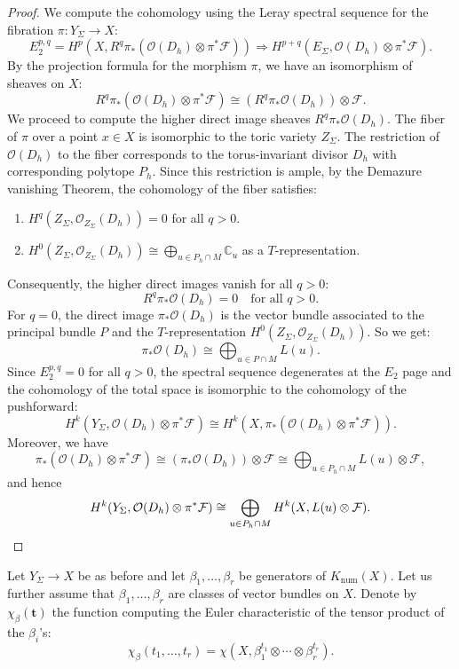 \documentclass[oneside]{amsart}
\theoremstyle{plain}
\theoremstyle{definition}
\newcommand{\C}{{\mathbb{C}}}
\newcommand{\Om}{{\mathcal{O}}}
\newcommand{\num}{{\mathrm{num}}}
\begin{document}
\begin{proof}
We compute the cohomology using the Leray spectral sequence for the fibration $\pi: Y_\Sigma \to X$:
\[
E_2^{p,q} = H^p(X, R^q \pi_* (\Om(D_h) \otimes \pi^* \mathcal{F})) \Rightarrow H^{p+q}(E_\Sigma, \Om(D_h) \otimes \pi^* \mathcal{F}).
\]
By the projection formula for the morphism $\pi$, we have an isomorphism of sheaves on $X$:
\[
R^q \pi_* (\Om(D_h) \otimes \pi^* \mathcal{F}) \cong (R^q \pi_* \Om(D_h)) \otimes \mathcal{F}.
\]
We proceed to compute the higher direct image sheaves $R^q \pi_*\Om(D_h)$. The fiber of $\pi$ over a point $x \in X$ is isomorphic to the toric variety $Z_\Sigma$. The restriction of $\Om(D_h)$ to the fiber corresponds to the torus-invariant divisor $D_h$ with corresponding polytope $P_h$. Since this restriction is ample, by the Demazure vanishing Theorem, the cohomology of the fiber satisfies:
\begin{enumerate}
    \item $H^q(Z_\Sigma, \Om_{Z_\Sigma}(D_h)) = 0$ for all $q > 0$.
    \item $H^0(Z_\Sigma, \Om_{Z_\Sigma}(D_h)) \cong \bigoplus_{u \in P_h \cap M} \C_u$ as a $T$-representation.
\end{enumerate}
Consequently, the higher direct images vanish for all $q > 0$:
\[
R^q \pi_* \Om(D_h) = 0 \quad \text{for all } q > 0.
\]
For $q=0$, the direct image $\pi_* \Om(D_h)$ is the vector bundle associated to the principal bundle $P$ and the $T$-representation $H^0(Z_\Sigma, \Om_{Z_\Sigma}(D_h))$. So we get:
\[
\pi_* \Om(D_h) \cong \bigoplus_{u \in P \cap M} L(u).
\]
Since $E_2^{p,q} = 0$ for all $q > 0$,
the spectral sequence degenerates at the $E_2$ page and the cohomology of the total space is isomorphic to the cohomology of the pushforward:
\[
H^k(Y_\Sigma, \Om(D_h)\otimes \pi^* \mathcal{F}) \cong H^k(X, \pi_* (\Om(D_h) \otimes \pi^* \mathcal{F})).
\]
Moreover, we have
\[
\pi_* (\Om(D_h) \otimes \pi^* \mathcal{F}) \cong (\pi_* \Om(D_h)) \otimes \mathcal{F} \cong  \bigoplus_{u \in P_h \cap M}L(u)  \otimes \mathcal{F},
\]
and hence
\[
H^k(Y_\Sigma, \Om(D_h) \otimes \pi^* \mathcal{F}) \cong \bigoplus_{u \in P_h \cap M} H^k(X, L(u) \otimes \mathcal{F}). \qedhere
\]
\end{proof}

Let $Y_\Sigma \to X$ be as before and let $\beta_1,\ldots, \beta_r$ be generators of $K_\num(X)$. Let us further assume that $\beta_1,\ldots, \beta_r$ are classes of vector bundles on $X$. Denote by $\chi_{\beta}(\mathbf{t})$ the function computing the Euler characteristic of the tensor product of the $\beta_i$'s:
    \[
    \chi_{\beta}(t_1,\ldots,t_r) = \chi(X, \beta_1^{t_1}\otimes\cdots\otimes\beta_r^{t_r}).
    \]
\end{document}
